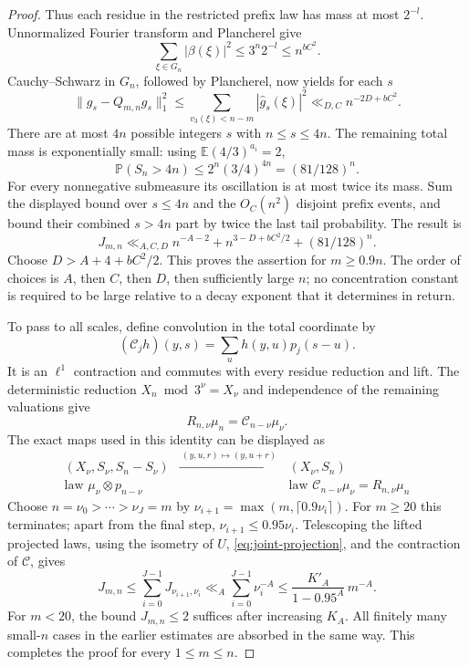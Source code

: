 \documentclass[11pt]{article}
\theoremstyle{remark}\newtheorem{remark}[proposition]{Remark}
\newcommand{\PP}{\mathbb P}
\newcommand{\EE}{\mathbb E}
\begin{document}
\begin{proof}
Thus each residue in the restricted prefix law has mass at most $2^{-l}$.
Unnormalized Fourier transform and Plancherel give
\begin{equation}\label{eq:joint-prefix}
 \sum_{\xi\in G_n}|\beta(\xi)|^2
 \le3^n2^{-l}\le n^{bC^2}.
\end{equation}
Cauchy--Schwarz in $G_n$, followed by Plancherel, now yields for each $s$
\[
 \|g_s-Q_{m,n}g_s\|_1^2
 \le\sum_{v_3(\xi)<n-m}|\widehat g_s(\xi)|^2
 \ll_{D,C}n^{-2D+bC^2}.
\]
There are at most $4n$ possible integers $s$ with $n\le s\le4n$.
The remaining total mass is exponentially small: using
$\EE(4/3)^{a_i}=2$,
\[
 \PP(S_n>4n)\le2^n(3/4)^{4n}=(81/128)^n.
\]
For every nonnegative submeasure its oscillation is at most twice its
mass. Sum the displayed bound over $s\le4n$ and the $O_C(n^2)$
disjoint prefix events, and bound their combined $s>4n$ part by twice
the last tail probability. The result is
\[
 J_{m,n}\ll_{A,C,D}n^{-A-2}+n^{3-D+bC^2/2}+(81/128)^n.
\]
Choose $D>A+4+bC^2/2$. This proves the assertion for $m\ge0.9n$.
The order of choices is $A$, then $C$, then $D$, then sufficiently
large $n$; no concentration constant is required to be large relative
to a decay exponent that it determines in return.

To pass to all scales, define convolution in the total coordinate by
\[
 (\mathcal C_jh)(y,s)=\sum_u h(y,u)p_j(s-u).
\]
It is an $\ell^1$ contraction and commutes with every residue reduction
and lift. The deterministic reduction $X_n\bmod3^\nu=X_\nu$ and
independence of the remaining valuations give
\begin{equation}\label{eq:joint-projection}
 R_{n,\nu}\mu_n=\mathcal C_{n-\nu}\mu_\nu.
\end{equation}
The exact maps used in this identity can be displayed as
\[
 \begin{array}{ccc}
 (X_\nu,S_\nu,S_n-S_\nu)&\xrightarrow{\ (y,u,r)\mapsto(y,u+r)\ }&(X_\nu,S_n)\\
 \text{law }\mu_\nu\otimes p_{n-\nu}&&
 \text{law }\mathcal C_{n-\nu}\mu_\nu=R_{n,\nu}\mu_n
 \end{array}
\]
Choose $n=\nu_0>\cdots>\nu_J=m$ by
$\nu_{i+1}=\max(m,\lceil0.9\nu_i\rceil)$. For $m\ge20$ this terminates;
apart from the final step, $\nu_{i+1}\le0.95\nu_i$.
Telescoping the lifted projected laws, using the isometry of $U$,
\eqref{eq:joint-projection}, and the contraction of $\mathcal C$, gives
\[
 J_{m,n}\le\sum_{i=0}^{J-1}J_{\nu_{i+1},\nu_i}
 \ll_A\sum_{i=0}^{J-1}\nu_i^{-A}
 \le\frac{K'_A}{1-0.95^A}\,m^{-A}.
\]
For $m<20$, the bound $J_{m,n}\le2$ suffices after increasing $K_A$.
All finitely many small-$n$ cases in the earlier estimates are absorbed
in the same way. This completes the proof for every $1\le m\le n$.
\end{proof}
\end{document}
